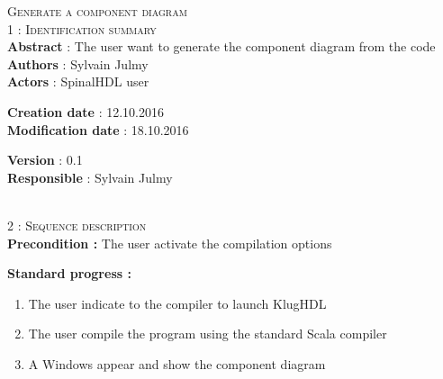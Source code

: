 \begin{flushleft}
    \textsc{\huge Generate a component diagram}\\[0.5cm]

    \BlackLine
    \textsc{\Large 1 : Identification summary}\\[0.3cm]

        \textbf{\large Abstract} : The user want to generate the component diagram from the code \\[0.1cm]

        \textbf{\large Authors} : Sylvain Julmy \\[0.3cm]			

        \textbf{\large Actors} : SpinalHDL user \\[0.1cm]	
    \begin{minipage}{0.40\textwidth}
        \begin{flushleft}	
            \textbf{\large Creation date} : 12.10.2016 \\[0.1cm]

            \textbf{\large Modification date} : 18.10.2016 \\[0.1cm]
        \end{flushleft}
    \end{minipage}
    \begin{minipage}{0.40\textwidth}
        \begin{flushleft}
            \textbf{\large Version} : 0.1 \\[0.1cm]

            \textbf{\large Responsible} : Sylvain Julmy \\[0.1cm]
        \end{flushleft}
    \end{minipage}
    \\[0.5cm]
    \BlackLine
    \textsc{\Large 2 : Sequence description}\\[0.3cm]

    \textbf{\large Precondition :} The user activate the compilation options

    \textbf{\large  Standard progress :}
    \begin{enumerate}[nosep]
        \item The user indicate to the compiler to launch KlugHDL
        \item The user compile the program using the standard Scala compiler
        \item A Windows appear and show the component diagram
    \end{enumerate}


\end{flushleft}
